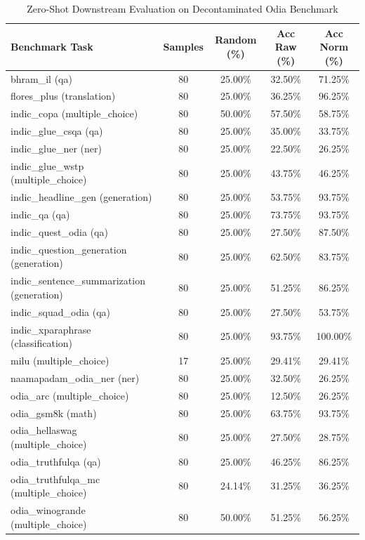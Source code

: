 \begin{table}[ht]
\centering
\caption{Zero-Shot Downstream Evaluation on Decontaminated Odia Benchmark}
\begin{tabular}{lcccc}
\hline
\textbf{Benchmark Task} & \textbf{Samples} & \textbf{Random (\%)} & \textbf{Acc Raw (\%)} & \textbf{Acc Norm (\%)} \\
\hline
bhram\_il (qa) & 80 & 25.00\% & 32.50\% & 71.25\% \\
flores\_plus (translation) & 80 & 25.00\% & 36.25\% & 96.25\% \\
indic\_copa (multiple\_choice) & 80 & 50.00\% & 57.50\% & 58.75\% \\
indic\_glue\_csqa (qa) & 80 & 25.00\% & 35.00\% & 33.75\% \\
indic\_glue\_ner (ner) & 80 & 25.00\% & 22.50\% & 26.25\% \\
indic\_glue\_wstp (multiple\_choice) & 80 & 25.00\% & 43.75\% & 46.25\% \\
indic\_headline\_gen (generation) & 80 & 25.00\% & 53.75\% & 93.75\% \\
indic\_qa (qa) & 80 & 25.00\% & 73.75\% & 93.75\% \\
indic\_quest\_odia (qa) & 80 & 25.00\% & 27.50\% & 87.50\% \\
indic\_question\_generation (generation) & 80 & 25.00\% & 62.50\% & 83.75\% \\
indic\_sentence\_summarization (generation) & 80 & 25.00\% & 51.25\% & 86.25\% \\
indic\_squad\_odia (qa) & 80 & 25.00\% & 27.50\% & 53.75\% \\
indic\_xparaphrase (classification) & 80 & 25.00\% & 93.75\% & 100.00\% \\
milu (multiple\_choice) & 17 & 25.00\% & 29.41\% & 29.41\% \\
naamapadam\_odia\_ner (ner) & 80 & 25.00\% & 32.50\% & 26.25\% \\
odia\_arc (multiple\_choice) & 80 & 25.00\% & 12.50\% & 26.25\% \\
odia\_gsm8k (math) & 80 & 25.00\% & 63.75\% & 93.75\% \\
odia\_hellaswag (multiple\_choice) & 80 & 25.00\% & 27.50\% & 28.75\% \\
odia\_truthfulqa (qa) & 80 & 25.00\% & 46.25\% & 86.25\% \\
odia\_truthfulqa\_mc (multiple\_choice) & 80 & 24.14\% & 31.25\% & 36.25\% \\
odia\_winogrande (multiple\_choice) & 80 & 50.00\% & 51.25\% & 56.25\% \\

\end{tabular}
\end{table}
